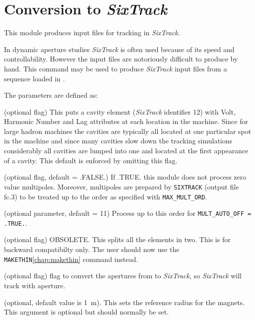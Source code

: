 

\chapter{Conversion to \textit{SixTrack}}
\label{chap:sixtrack}

This module produces input files for tracking in \textit{SixTrack}.

In dynamic aperture studies \textit{SixTrack}\cite{SixTrack} is often
used because of its  speed and controllability. However the input files
are notoriously difficult to produce by hand. This command may be used
to produce \textit{SixTrack} input files from a sequence loaded in \madx.

 
The parameters are defined as: 
\begin{madlist}
    (optional flag) This puts a cavity element
   (\textit{SixTrack} identifier 12) with Volt, Harmonic Number and Lag attributes at
   each location in the machine. Since for large hadron machines the
   cavities are typically all located at one particular spot in the
   machine and since many cavities slow down the tracking simulations
   considerably all cavities are lumped into one and located at the
   first appearance of a cavity. This default is enforced by omitting
   this flag.  

    (optional flag, default = .FALSE.) If
   .TRUE. this module does not process zero value
   multipoles. Moreover, multipoles are prepared by \texttt{SIXTRACK}
   (output file fc.3) to be treated up to the order as specified with
   \texttt{MAX\_MULT\_ORD}.  

    (optional parameter, default = 11) Process up
   to this order for \texttt{MULT\_AUTO\_OFF = .TRUE.}.  

    (optional flag) OBSOLETE. This splits all the
   elements in  two. This is for backward compatibilty only. The user
   should now use the \texttt{MAKETHIN}\ref{chap:makethin}
   command instead.  

    (optional flag) flag to convert the apertures
   from \madx to \textit{SixTrack}, so \textit{SixTrack} will track
   with aperture.   

    (optional, default value is 1~m). This sets the
   reference  radius for the magnets. This argument is optional but
   should normally be set.  
\end{madlist}

